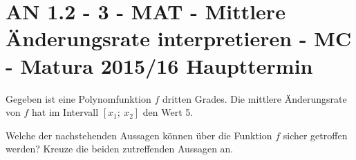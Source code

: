 \section{AN 1.2 - 3 - MAT - Mittlere Änderungsrate interpretieren - MC - Matura 2015/16 Haupttermin}

\begin{beispiel}[AN 1.2]{1} %
Gegeben ist eine Polynomfunktion $f$ dritten Grades. Die mittlere Änderungsrate von $f$ hat im Intervall $[x_1;~ x_2]$ den Wert 5.

Welche der nachstehenden Aussagen können über die Funktion $f$ sicher getroffen werden?
Kreuze die beiden zutreffenden Aussagen an.

\end{beispiel}
